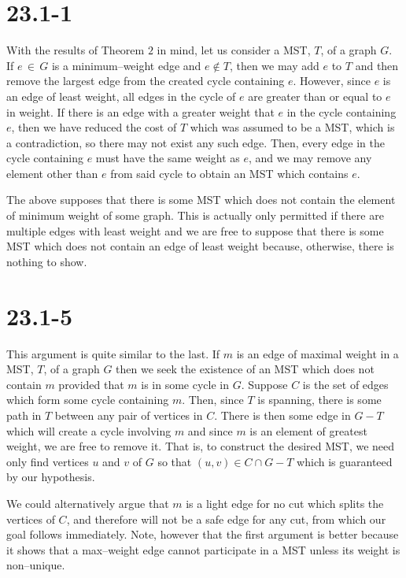 \documentclass{article}
\begin{document}
  \section*{23.1-1}
    With the results of Theorem $2$ in mind, let us consider a MST, $T$, of a graph $G$. 
    If $e\,\in\,G$ is a minimum--weight edge and $e \not\in T$, then we may add $e$ to $T$ and then remove the largest edge from the created cycle containing $e$.
    However, since $e$ is an edge of least weight, all edges in the cycle of $e$ 
    are greater than or equal to $e$ in weight.
    If there is an edge with a greater weight that $e$ in the cycle containing $e$, then
    we have reduced the cost of $T$ which was assumed to be a MST, which is a 
    contradiction, so there may not exist any such edge.
    Then, every edge in the cycle containing $e$ must have the same weight as $e$,
    and we may remove any element other than $e$ from said cycle to obtain an 
    MST which contains $e$. 

    The above supposes that there is some MST which does not contain the element of
    minimum weight of some graph.
    This is actually only permitted if there are multiple edges with least weight and 
    we are free to suppose that there is some MST which does not contain an edge
    of least weight because, otherwise, there is nothing to show.

  \section*{23.1-5}
    This argument is quite similar to the last. 
    If $m$ is an edge of maximal weight in a MST, $T$, of a graph $G$
    then we seek the existence of an MST which does not contain $m$ provided that
    $m$ is in some cycle in $G$. 
    Suppose $C$ is the set of edges which form some cycle containing $m$.
    Then, since $T$ is spanning, there is some path in $T$ between any pair of 
    vertices in $C$.
    There is then some edge in $G - T$ which will create a cycle involving $m$
    and since $m$ is an element of greatest weight, we are free to remove it.
    That is, to construct the desired MST, we need only find vertices $u$ and $v$ of $G$ so that $(u,v) \in C \cap G-T$ which is guaranteed by our hypothesis.

    We could alternatively argue that $m$ is a light edge for no cut which splits the 
    vertices of $C$, and therefore will not be a safe edge for any cut, from which our goal follows immediately. 
    Note, however that the first argument is better because it shows that 
    a max--weight edge cannot participate in a MST unless its weight is 
    non--unique.
\end{document}
